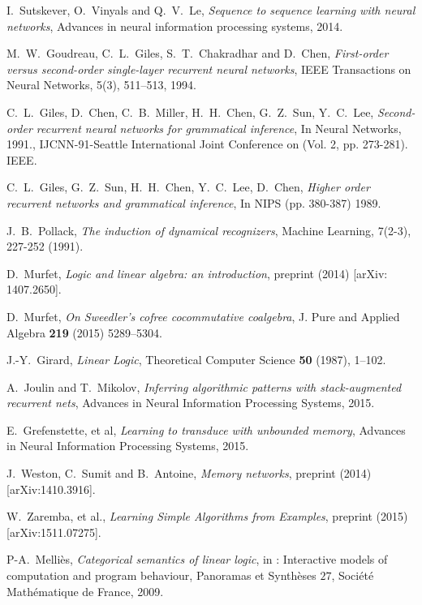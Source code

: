 \documentclass[english,letter paper,12pt,leqno]{article}
\theoremstyle{example}
\numberwithin{equation}{section}
\begin{document}
\begin{thebibliography}{BHLS03}
I.~Sutskever, O.~Vinyals and Q.~V.~Le, \textsl{Sequence to sequence learning with neural networks}, Advances in neural information processing systems, 2014.

M.~W.~Goudreau, C.~L.~Giles, S.~T.~Chakradhar and D.~Chen, \textsl{First-order versus second-order single-layer recurrent neural networks}, IEEE Transactions on Neural Networks, 5(3), 511--513, 1994.

C.~L.~Giles, D.~Chen, C.~B.~Miller, H.~H.~Chen, G.~Z.~Sun, Y.~C.~Lee, \textsl{Second-order recurrent neural networks for grammatical inference}, In Neural Networks, 1991., IJCNN-91-Seattle International Joint Conference on (Vol. 2, pp. 273-281). IEEE.

C.~L.~Giles, G.~Z.~Sun, H.~H.~Chen, Y.~C.~Lee, D.~Chen, \textsl{Higher order recurrent networks and grammatical inference}, In NIPS (pp. 380-387) 1989.

J.~B.~Pollack, \textsl{The induction of dynamical recognizers}, Machine Learning, 7(2-3), 227-252 (1991). 

D.~Murfet, \textsl{Logic and linear algebra: an introduction}, preprint (2014) [arXiv: 1407.2650].

D.~Murfet, \textsl{On Sweedler's cofree cocommutative coalgebra}, J. Pure and Applied Algebra \textbf{219} (2015) 5289--5304.

J.-Y.~Girard, \textsl{Linear Logic}, Theoretical Computer Science \textbf{50} (1987), 1--102.

A.~Joulin and T.~Mikolov, \textsl{Inferring algorithmic patterns with stack-augmented recurrent nets}, Advances in Neural Information Processing Systems, 2015.

E.~Grefenstette, et al, \textsl{Learning to transduce with unbounded memory}, Advances in Neural Information Processing Systems, 2015.

J.~Weston, C.~Sumit and B.~Antoine, \textsl{Memory networks}, preprint (2014) [arXiv:1410.3916].

W.~Zaremba, et al., \textsl{Learning Simple Algorithms from Examples}, preprint (2015) [arXiv:1511.07275].

P-A.~Melli\`{e}s, \textsl{Categorical semantics of linear logic}, in : Interactive models of computation and program behaviour, Panoramas et Synth\`{e}ses $27$, Soci\'{e}t\'{e} Math\'{e}matique de France, 2009.


\end{thebibliography}
\end{document}

